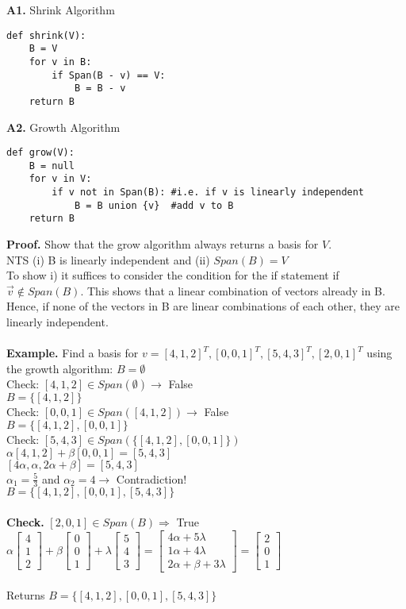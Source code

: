 \documentclass [12pt]{article}
\begin{document}
\begin{framed}
\noindent\textbf{A1. }Shrink Algorithm
\begin{lstlisting}
def shrink(V):
    B = V
    for v in B:
        if Span(B - v) == V:
            B = B - v
    return B
\end{lstlisting}
\end{framed}
\pagebreak
\begin{framed}
\noindent\textbf{A2. }Growth Algorithm
\begin{lstlisting}
def grow(V):
    B = null
    for v in V:
        if v not in Span(B): #i.e. if v is linearly independent
            B = B union {v}  #add v to B
    return B
\end{lstlisting}
\end{framed}
\noindent\textbf{Proof.} Show that the grow algorithm always returns a basis for $V$.\\
NTS (i) B is linearly independent and (ii) $Span(B)=V$\\
To show i) it suffices to consider the condition for the if statement if $\overrightarrow{v}\notin Span(B)$. This shows that a linear combination of vectors already in B. Hence, if none of the vectors in B are linear combinations of each other, they are linearly independent. \\\\
\noindent\textbf{Example. }Find a basis for $v={[4,1,2]^T,[0,0,1]^T,[5,4,3]^T,[2,0,1]^T}$ using the growth algorithm: $B = \emptyset$\\
Check: $[4,1,2]\in Span(\emptyset)\rightarrow $ False\\
\indent $B=\{[4,1,2]\}$\\
Check: $[0,0,1]\in Span([4,1,2])\rightarrow$ False\\
\indent $B=\{[4,1,2],[0,0,1]\}$\\
Check: $[5,4,3]\in Span(\{[4,1,2],[0,0,1]\})$\\
\indent $\alpha[4,1,2]+\beta[0,0,1]=[5,4,3]$\\
\indent $[4\alpha,\alpha,2\alpha+\beta]=[5,4,3]$\\
\indent $\alpha_1=\frac{5}{3}$ and $\alpha_2=4\rightarrow$ Contradiction!\\
$B=\{[4,1,2],[0,0,1],[5,4,3]\}$\\\\
\noindent\textbf{Check.} $[2,0,1]\in Span(B) \Rightarrow$ True\\
$\alpha\begin{bmatrix}
4\\
1\\
2
\end{bmatrix}+
\beta\begin{bmatrix}
0\\
0\\
1
\end{bmatrix}+
\lambda\begin{bmatrix}
5\\
4\\
3
\end{bmatrix}=
\begin{bmatrix}
4\alpha+5\lambda\\
1\alpha+4\lambda\\
2\alpha+\beta+3\lambda
\end{bmatrix}=
\begin{bmatrix}
2\\
0\\
1
\end{bmatrix}$\\\\
Returns $B=\{[4,1,2],[0,0,1],[5,4,3]\}$
\end{document}

